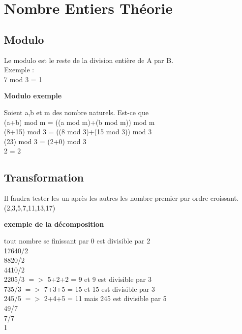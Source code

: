 \newpage

\chapter{Nombre Entiers Théorie}
\vspace{3mm} %
\section{Modulo}
\vspace{3mm} %

Le modulo est le reste de la division entière de A par B. \\

Exemple : \\

7 mod 3 = 1

\vspace{3mm} %
\textbf{Modulo exemple}
\vspace{3mm} %

Soient a,b et m des nombre naturels. Est-ce que\\
(a+b) mod m = ((a mod m)+(b mod m)) mod m \\

(8+15) mod 3 = ((8 mod 3)+(15 mod 3)) mod 3 \\
(23) mod 3 = (2+0) mod 3 \\
2 = 2 \\


\vspace{3mm} %
\section{Transformation}
\vspace{3mm} %

Il faudra tester les un après les autres les nombre premier par ordre croissant. \\

(2,3,5,7,11,13,17)

\vspace{3mm} %
\textbf{exemple de la décomposition}
\vspace{3mm} %

tout nombre se finissant par 0 est divisible par 2 \\

17640/2 \\
8820/2  \\
4410/2  \\
2205/3 $=>$ 5+2+2 = 9 et 9 est divisible par 3 \\
735/3 $=>$ 7+3+5 = 15 et 15 est divisible par 3 \\
245/5 $=>$ 2+4+5 = 11 mais 245 est divisible par 5 \\
49/7 \\
7/7 \\
1

